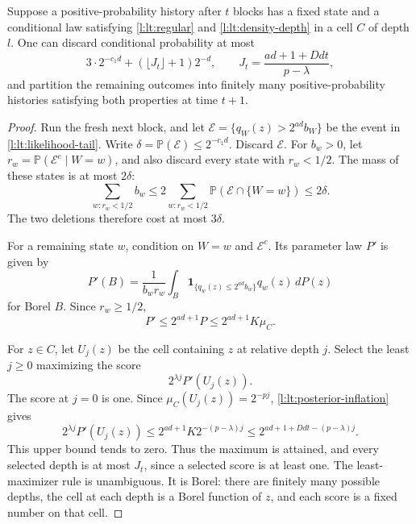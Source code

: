 \begin{lemma}
\label{lem:l-lt-selection-step}
Suppose a positive-probability history after $t$ blocks has a fixed
state and a conditional law satisfying \eqref{l:lt:regular} and
\eqref{l:lt:density-depth} in a cell $C$ of depth $l$.  One can
discard conditional probability at most
\begin{equation}\label{l:lt:one-step-deletion}
 3\cdot2^{-c_1d}+(\lfloor J_t\rfloor+1)2^{-d},
 \qquad
 J_t=\frac{ad+1+Ddt}{p-\lambda},
\end{equation}
and partition the remaining outcomes into finitely many
positive-probability histories satisfying both properties at time
$t+1$.
\end{lemma}
\begin{proof}
Run the fresh next block, and let
$\mathcal E=\{q_W(z)>2^{ad}b_W\}$ be the event in
\eqref{l:lt:likelihood-tail}.  Write
$\delta=\mathbb P(\mathcal E)\le2^{-c_1d}$.  Discard $\mathcal E$.
For $b_w>0$, let
$r_w=\mathbb P(\mathcal E^c\mid W=w)$, and also discard every state
with $r_w<1/2$.  The mass of these states is at most $2\delta$:
\[
 \sum_{w:r_w<1/2}b_w
 \le2\sum_{w:r_w<1/2}\mathbb P(\mathcal E\cap\{W=w\})
 \le2\delta.
\]
The two deletions therefore cost at most $3\delta$.

For a remaining state $w$, condition on $W=w$ and $\mathcal E^c$.
Its parameter law $P'$ is given by
\[
 P'(B)=\frac1{b_wr_w}
 \int_B \mathbf1_{\{q_w(z)\le2^{ad}b_w\}}q_w(z)\,dP(z)
\]
for Borel $B$.  Since $r_w\ge1/2$,
\begin{equation}\label{l:lt:posterior-inflation}
 P'\le2^{ad+1}P\le2^{ad+1}K\mu_C.
\end{equation}

For $z\in C$, let $U_j(z)$ be the cell containing $z$ at relative
depth $j$.  Select the least $j\ge0$ maximizing the score
\begin{equation}\label{l:lt:score}
 2^{\lambda j}P'(U_j(z)).
\end{equation}
The score at $j=0$ is one.  Since
$\mu_C(U_j(z))=2^{-pj}$, \eqref{l:lt:posterior-inflation} gives
\[
 2^{\lambda j}P'(U_j(z))
 \le2^{ad+1}K2^{-(p-\lambda)j}
 \le2^{ad+1+Ddt-(p-\lambda)j}.
\]
This upper bound tends to zero.  Thus the maximum is attained, and
every selected depth is at most $J_t$, since a selected score is at
least one.  The least-maximizer rule is unambiguous.  It is Borel:
there are finitely many possible depths, the cell at each depth is a
Borel function of $z$, and each score is a fixed number on that cell.


\end{proof}
